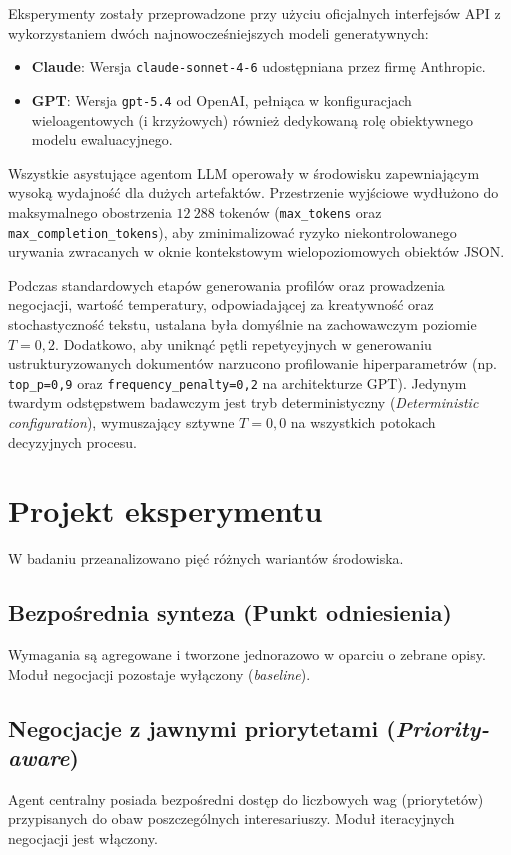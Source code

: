 \documentclass[conference]{IEEEtran}
\begin{document}
Eksperymenty zostały przeprowadzone przy użyciu oficjalnych interfejsów API z wykorzystaniem dwóch najnowocześniejszych modeli generatywnych:
\begin{itemize}
\item \textbf{Claude}: Wersja \texttt{claude-sonnet-4-6} udostępniana przez firmę Anthropic.
\item \textbf{GPT}: Wersja \texttt{gpt-5.4} od OpenAI, pełniąca w konfiguracjach wieloagentowych (i krzyżowych) również dedykowaną rolę obiektywnego modelu ewaluacyjnego.
\end{itemize}

Wszystkie asystujące agentom LLM operowały w środowisku zapewniającym wysoką wydajność dla dużych artefaktów. Przestrzenie wyjściowe wydłużono do maksymalnego obostrzenia $12\ 288$ tokenów (\texttt{max\_tokens} oraz \texttt{max\_completion\_tokens}), aby zminimalizować ryzyko niekontrolowanego urywania zwracanych w oknie kontekstowym wielopoziomowych obiektów JSON.

Podczas standardowych etapów generowania profilów oraz prowadzenia negocjacji, wartość temperatury, odpowiadającej za kreatywność oraz stochastyczność tekstu, ustalana była domyślnie na zachowawczym poziomie $T=0{,}2$. Dodatkowo, aby uniknąć pętli repetycyjnych w generowaniu ustrukturyzowanych dokumentów narzucono profilowanie hiperparametrów (np. \texttt{top\_p=0{,}9} oraz \texttt{frequency\_penalty=0{,}2} na architekturze GPT). Jedynym twardym odstępstwem badawczym jest tryb deterministyczny (\textit{Deterministic configuration}), wymuszający sztywne $T=0{,}0$ na wszystkich potokach decyzyjnych procesu.

\section{Projekt eksperymentu}

W badaniu przeanalizowano pięć różnych wariantów środowiska.

\subsection{Bezpośrednia synteza (Punkt odniesienia)}
Wymagania są agregowane i tworzone jednorazowo w oparciu o zebrane opisy. Moduł negocjacji pozostaje wyłączony (\textit{baseline}).

\subsection{Negocjacje z jawnymi priorytetami (\textit{Priority-aware})}
Agent centralny posiada bezpośredni dostęp do liczbowych wag (priorytetów) przypisanych do obaw poszczególnych interesariuszy. Moduł iteracyjnych negocjacji jest włączony.
\end{document}
